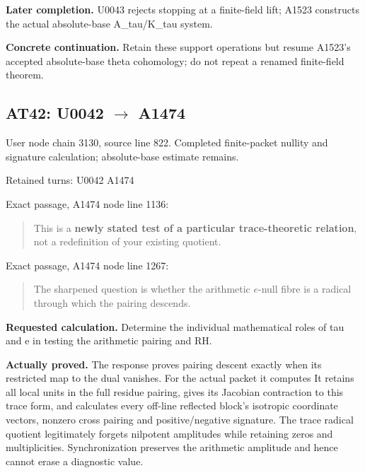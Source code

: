 \textbf{Later completion.} U0043 rejects stopping at a finite-field
lift; A1523 constructs the actual absolute-base A\_tau/K\_tau system.

\textbf{Concrete continuation.} Retain these support operations but
resume A1523's accepted absolute-base theta cohomology; do not repeat a
renamed finite-field theorem.

\subsection{\texorpdfstring{AT42: U0042
\allowbreak{}\ensuremath{→}\allowbreak{}
A1474}{AT42: U0042  A1474}}\label{TranscriptLedgerStage:at42-u0042-a1474}

User node \protect{} chain
3130, source line 822. Completed finite-packet nullity and signature
calculation; absolute-base estimate remains.

Retained turns: U0042
\protect{} A1474
\protect{}

Exact passage, A1474 node
\protect{} line 1136:

\begin{quote}
This is a \textbf{newly stated test of a particular trace-theoretic
relation}, not a redefinition of your existing quotient.
\end{quote}

Exact passage, A1474 node
\protect{} line 1267:

\begin{quote}
The sharpened question is whether the arithmetic \(e\)-null fibre is a
radical through which the pairing descends.
\end{quote}

\textbf{Requested calculation.} Determine the individual mathematical
roles of tau and e in testing the arithmetic pairing and RH.

\textbf{Actually proved.} The response proves pairing descent exactly
when its restricted map to the dual vanishes. For the actual packet it
computes  It retains all local units in the full residue pairing, gives its
Jacobian contraction to this trace form, and calculates every off-line
reflected block's isotropic coordinate vectors, nonzero cross pairing
and positive/negative signature. The trace radical quotient legitimately
forgets nilpotent amplitudes while retaining zeros and multiplicities.
Synchronization preserves the arithmetic amplitude and hence cannot
erase a diagnostic value.

